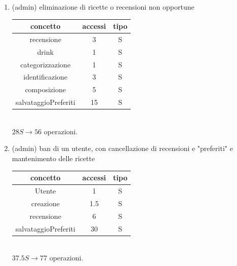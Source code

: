 \documentclass[a4paper,12pt]{report}
\begin{document}
\begin{enumerate}
    \item (admin) eliminazione di ricette o recensioni non opportune\\
    \begin{tabular}{c|c|c}
    concetto & accessi & tipo\\
    \hline
        recensione & 3 & S\\
        drink & 1 & S\\
        categorizzazione & 1 & S\\
        identificazione & 3 & S\\
        composizione & 5 & S\\
        salvataggioPreferiti & 15 & S\\
    \hline
    \end{tabular}
    \\ $28S\to56$ operazioni.

    \item (admin) ban di un utente, con cancellazione di recensioni e "preferiti" e mantenimento delle ricette\\
        \begin{tabular}{c|c|c}
    concetto & accessi & tipo\\
    \hline
        Utente & 1 & S\\
        creazione & 1.5 & S\\
        recensione & 6 & S\\
        salvataggioPreferiti & 30 & S\\
    \hline
    \end{tabular}
    \\ $37.5S\to77$ operazioni.
\end{enumerate}
\end{document}
